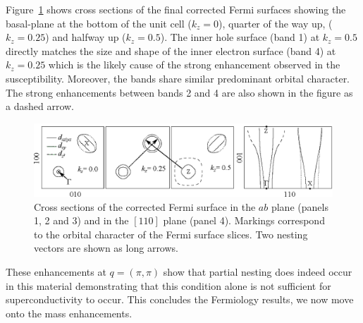 Figure~\ref{Fig:ResD:ZSlices} shows cross sections of the final corrected Fermi surfaces showing the basal-plane at the bottom of the unit cell ($k_z=0$), quarter of the way up, ($k_z=0.25$) and halfway up ($k_z=0.5$). The inner hole surface (band 1) at $k_z=0.5$ directly matches the size and shape of the inner electron surface (band 4) at $k_z=0.25$ which is the likely cause of the strong enhancement observed in the susceptibility. Moreover, the bands share similar predominant \DxzDyz orbital character. The strong enhancements between bands 2 and 4 are also shown in the figure as a dashed arrow.

\begin{figure}[htbp]
    \begin{center}
        \includegraphics[scale=0.9]{Chapter-dHvABaFe2P2/Figures/AngleDepMeasurements/ZSlices/ZSlices}
        \caption{Cross sections of the corrected Fermi surface in the $ab$ plane (panels 1, 2 and 3) and in the $[110]$ plane (panel 4). Markings correspond to the orbital character of the Fermi surface slices. Two nesting vectors are shown as long arrows.}
        \label{Fig:ResD:ZSlices}
    \end{center}
\end{figure}

These enhancements at $q=(\pi, \pi)$ show that partial nesting does indeed occur in this material demonstrating that this condition alone is not sufficient for superconductivity to occur. This concludes the Fermiology results, we now move onto the mass enhancements.


